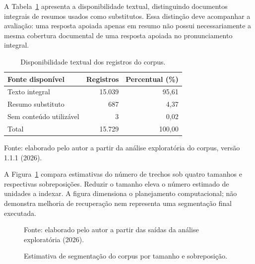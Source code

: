 A Tabela~\ref{tab:cobertura-corpus} apresenta a disponibilidade textual, distinguindo documentos integrais de resumos usados como substitutos. Essa distinção deve acompanhar a avaliação: uma resposta apoiada apenas em resumo não possui necessariamente a mesma cobertura documental de uma resposta apoiada no pronunciamento integral.

\begin{table}[htbp]
\centering
\caption{Disponibilidade textual dos registros do corpus.}\label{tab:cobertura-corpus}
\begin{tabular}{lrr}\toprule
Fonte disponível & Registros & Percentual (\%)\\\midrule
Texto integral & 15.039 & 95,61\\
Resumo substituto & 687 & 4,37\\
Sem conteúdo utilizável & 3 & 0,02\\\midrule
Total & 15.729 & 100,00\\\bottomrule
\end{tabular}
\par\smallskip Fonte: elaborado pelo autor a partir da análise exploratória do corpus, versão 1.1.1 (2026).
\end{table}

A Figura~\ref{fig:estimativa-segmentacao} compara estimativas do número de trechos sob quatro tamanhos e respectivas sobreposições. Reduzir o tamanho eleva o número estimado de unidades a indexar. A figura dimensiona o planejamento computacional; não demonstra melhoria de recuperação nem representa uma segmentação final executada.
\begin{figure}[htbp]
\centering
{}
\caption{Estimativa de segmentação do corpus por tamanho e sobreposição.}\label{fig:estimativa-segmentacao}
\par\smallskip Fonte: elaborado pelo autor a partir das saídas da análise exploratória (2026).
\end{figure}

